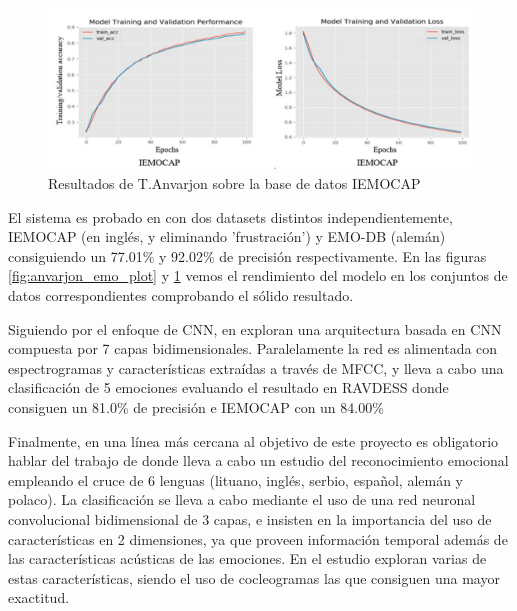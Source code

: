 \documentclass[11pt,a4paper,spanish]{book}
\begin{document}
	\begin{figure}[H]
		\centering
		\includegraphics[scale=0.35]{anvarjon2020_imeocap.JPG} 
		\caption{Resultados de T.Anvarjon sobre la base de datos IEMOCAP}
		\label{fig:anvarjon_ime_plot}
	\end{figure}

	El sistema es probado en con dos datasets distintos independientemente, IEMOCAP (en inglés, y eliminando 'frustración') y EMO-DB (alemán) consiguiendo un 77.01\% y 92.02\%  de precisión respectivamente. En las figuras \ref{fig:anvarjon_emo_plot} y \ref{fig:anvarjon_ime_plot} vemos el rendimiento del modelo en los conjuntos de datos correspondientes comprobando el sólido resultado.
	
	

	
	 Siguiendo por el enfoque de CNN, en \cite{Mustaqeem2020} exploran una arquitectura basada en CNN compuesta por 7 capas bidimensionales. Paralelamente la red es alimentada con espectrogramas y características extraídas a través de MFCC, y lleva a cabo una clasificación de 5 emociones evaluando el resultado en RAVDESS donde consiguen un 81.0\% de precisión e IEMOCAP con un 84.00\%
	 
	 Finalmente, en una línea más cercana al objetivo de este proyecto es obligatorio hablar del trabajo de \cite{Tamulevicius2020} donde lleva a cabo un estudio del reconocimiento emocional empleando el cruce de 6 lenguas (lituano, inglés, serbio, español, alemán y polaco). La clasificación se lleva a cabo mediante el uso de una red neuronal convolucional bidimensional de 3 capas, e insisten en la importancia del uso de características en 2 dimensiones, ya que proveen información temporal además de las características acústicas de las emociones. En el estudio exploran varias de estas características, siendo el uso de cocleogramas las que consiguen una mayor exactitud.
	
\end{document}
